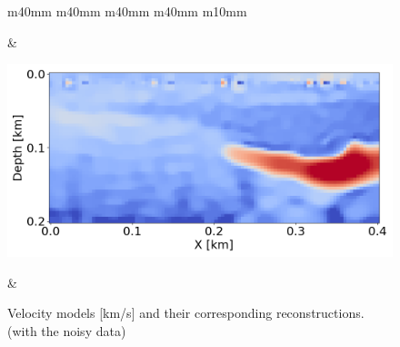 \begin{figure}[htbp]
\begin{tabular}{m{40mm} m{40mm} m{40mm} m{40mm} m{10mm}}
\begin{minipage}[b]{\linewidth}
            \vspace{-7mm}
            \caption*{Proposed, $\alpha = 350$}
            \vspace{1mm}
        \end{minipage} &
        \hspace{-15mm}
        \begin{minipage}[b]{\linewidth}
            \centering
            \includegraphics[width=\linewidth]{public/alpha_550_noisy}
            \vspace{-7mm}
            \caption*{Proposed, $\alpha = 550$}
            \vspace{1mm}
        \end{minipage} &
        \hspace{-18mm}
         \\
    \end{tabular}
    \vspace{-3mm}
    \caption{Velocity models [km/s] and their corresponding reconstructions. (with the noisy data)}
    \label{fig:velocity-models-noisy}
\end{figure}
